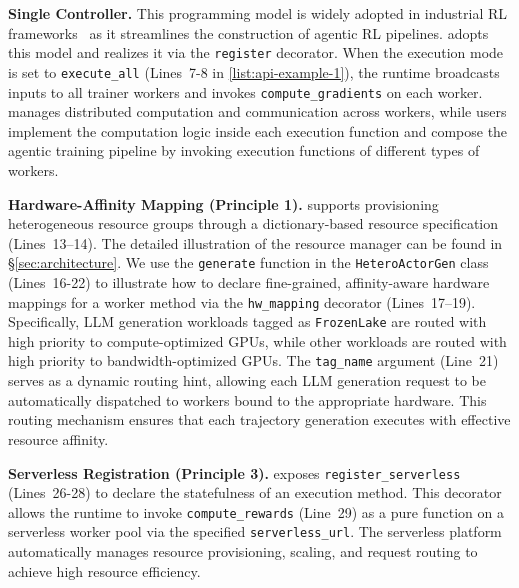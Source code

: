 \noindent\textbf{Single Controller.} This programming model is widely adopted in industrial RL frameworks~\cite{verl,slime_github} as it streamlines the construction of agentic RL pipelines. \SystemName{} adopts this model and realizes it via the \texttt{register} decorator. When the execution mode is set to \texttt{execute\_all} (Lines~7-8 in \autoref{list:api-example-1}), the runtime broadcasts inputs to all trainer workers and invokes \texttt{compute\_gradients} on each worker. \SystemName{} manages distributed computation and communication across workers, while users implement the computation logic inside each execution function and compose the agentic training pipeline by invoking execution functions of different types of workers. 



\noindent\textbf{Hardware-Affinity Mapping (Principle 1).} \SystemName{} supports provisioning heterogeneous resource groups through a dictionary-based resource specification (Lines~13–14). The detailed illustration of the resource manager can be found in \S\ref{sec:architecture}. We use the \texttt{generate} function in the \texttt{HeteroActorGen} class (Lines~16-22) to illustrate how to declare fine-grained, affinity-aware hardware mappings for a worker method via the \texttt{hw\_mapping} decorator (Lines~17–19). Specifically, LLM generation workloads tagged as \texttt{FrozenLake} are routed with high priority to compute-optimized GPUs, while other workloads are routed with high priority to bandwidth-optimized GPUs. The \texttt{tag\_name} argument (Line~21) serves as a dynamic routing hint, allowing each LLM generation request to be automatically dispatched to workers bound to the appropriate hardware. This routing mechanism ensures that each trajectory generation executes with effective resource affinity.

\noindent\textbf{Serverless Registration (Principle 3).} \SystemName{} exposes \texttt{register\_serverless} (Lines~26-28) to declare the statefulness of an execution method. This decorator allows the runtime to invoke \texttt{compute\_rewards} (Line~29) as a pure function on a serverless worker pool via the specified \texttt{serverless\_url}. The serverless platform automatically manages resource provisioning, scaling, and request routing to achieve high resource efficiency.


